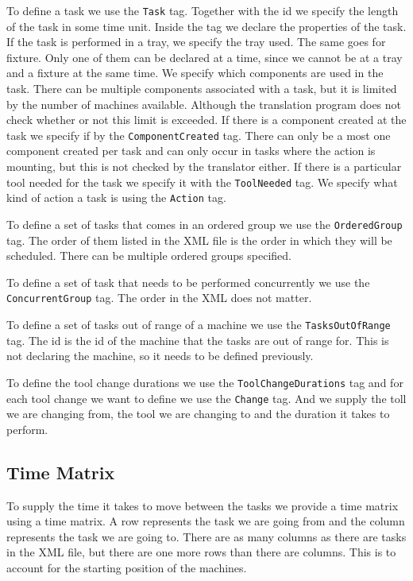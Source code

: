 To define a task we use the \texttt{Task} tag. Together with the id we specify the length of the task in some time unit. Inside the tag we declare the properties of the task. If the task is performed in a tray, we specify the tray used. The same goes for fixture. Only one of them can be declared at a time, since we cannot be at a tray and a fixture at the same time. We specify which components are used in the task. There can be multiple components associated with a task, but it is limited by the number of machines available. Although the translation program does not check whether or not this limit is exceeded. If there is a component created at the task we specify if by the \texttt{ComponentCreated} tag. There can only be a most one component created per task and can only occur in tasks where the action is mounting, but this is not checked by the translator either. If there is a particular tool needed for the task we specify it with the \texttt{ToolNeeded} tag. We specify what kind of action a task is using the \texttt{Action} tag.

To define a set of tasks that comes in an ordered group we use the \texttt{OrderedGroup} tag. The order of them listed in the XML file is the order in which they will be scheduled. There can be multiple ordered groups specified.

To define a set of task that needs to be performed concurrently we use the \texttt{ConcurrentGroup} tag. The order in the XML does not matter.

To define a set of tasks out of range of a machine we use the \texttt{TasksOutOfRange} tag. The id is the id of the machine that the tasks are out of range for. This is not declaring the machine, so it needs to be defined previously.

To define the tool change durations we use the \texttt{ToolChangeDurations} tag and for each tool change we want to define we use the \texttt{Change} tag. And we supply the toll we are changing from, the tool we are changing to and the duration it takes to perform.

\begin{figure}

\end{figure}

\subsection{Time Matrix}
To supply the time it takes to move between the tasks we provide a time matrix using a time matrix. A row represents the task we are going from and the column represents the task we are going to. There are as many columns as there are tasks in the XML file, but there are one more rows than there are columns. This is to account for the starting position of the machines.

